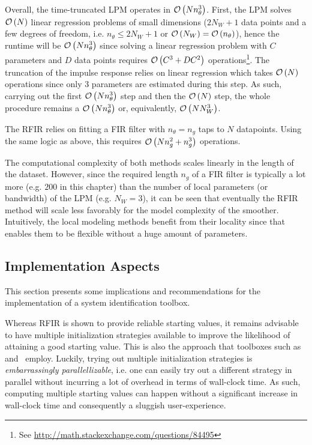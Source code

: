 
Overall, the time-truncated \gls{LPM} operates in $\mathcal{O} \left( N n_{\theta}^{3} \right)$.
First, the \gls{LPM} solves $\mathcal{O} \left( N \right)$ linear regression problems of small dimensions ($2N_W + 1$ data points and a few degrees of freedom, i.e. $n_{\theta} \leq 2 N_W + 1$ or $\mathcal{O} \left( N_W \right) = \mathcal{O} \left( n_{\theta} \right)$), hence the runtime will be $\mathcal{O} \left( N n_{\theta}^3 \right)$ since solving a linear regression problem with $C$ parameters and $D$ data points requires $\mathcal{O} \left( C^3  + D C^2 \right)$ operations\footnote{See \url{http://math.stackexchange.com/questions/84495}}.
The truncation of the impulse response relies on linear regression which takes $\mathcal{O} \left( N \right)$ operations since only $3$ parameters are estimated during this step.
As such, carrying out the first $\mathcal{O} \left( N n_{\theta}^3 \right)$ step and then the $\mathcal{O} \left( N \right)$ step, the whole procedure remains a $\mathcal{O} \left( N n_{\theta}^3 \right)$ or, equivalently, $\mathcal{O} \left( N N_W^3 \right)$.

The \gls{RFIR} relies on fitting a \gls{FIR} filter with $n_{\theta} = n_g$ taps to $N$ datapoints.
Using the same logic as above, this requires $\mathcal{O} \left( N n_{g}^2 + n_g^3 \right)$ operations.

The computational complexity  of both methods scales linearly in the length of the dataset.
However, since the required length $n_g$ of a \gls{FIR} filter is typically a lot more (e.g. $200$ in this chapter) than the number of local parameters (or bandwidth) of the \gls{LPM} (e.g. $N_W = 3$), it can be seen that eventually the \gls{RFIR} method will scale less favorably for the model complexity of the smoother.
Intuitively, the local modeling methods benefit from their locality since that enables them to be flexible without a huge amount of parameters.

\subsection{Implementation Aspects}
This section presents some implications and recommendations for the implementation of  a system identification toolbox.

Whereas \gls{RFIR} is shown to provide reliable starting values, it remains advisable to have multiple initialization strategies available to improve the likelihood of attaining a good starting value.
This is also the approach that toolboxes such as~\citep{FDIDENT} and~\citep{TDIDENT} employ.
Luckily, trying out multiple initialization strategies is \emph{embarrassingly parallellizable}, i.e. one can easily try out a different strategy in parallel without incurring a lot of overhead in terms of wall-clock time.
As such, computing multiple starting values can happen without a significant increase in wall-clock time and consequently a sluggish user-experience.

